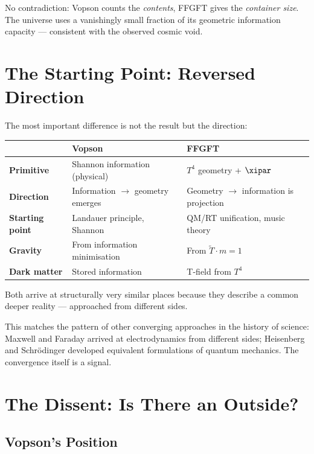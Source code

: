 No contradiction: Vopson counts the \emph{contents}, FFGFT gives the
\emph{container size}. The universe uses a vanishingly small fraction of its
geometric information capacity --- consistent with the observed cosmic void.

\section{The Starting Point: Reversed Direction}

The most important difference is not the result but the direction:

\begin{longtable}{>{\bfseries}p{3cm} p{5cm} p{5cm}}
\toprule
 & Vopson & FFGFT \\
\midrule
Primitive & Shannon information (physical) & $T^4$ geometry + $\xipar$ \\
Direction & Information $\rightarrow$ geometry emerges & Geometry $\rightarrow$ information is projection \\
Starting point & Landauer principle, Shannon & QM/RT unification, music theory \\
Gravity & From information minimisation & From $\tilde{T} \cdot m = 1$ \\
Dark matter & Stored information & T-field from $T^4$ \\
\bottomrule
\end{longtable}

Both arrive at structurally very similar places because they describe a common
deeper reality --- approached from different sides.

This matches the pattern of other converging approaches in the history of
science: Maxwell and Faraday arrived at electrodynamics from different sides;
Heisenberg and Schrödinger developed equivalent formulations of quantum
mechanics. The convergence itself is a signal.

\section{The Dissent: Is There an Outside?}

\subsection{Vopson's Position}

